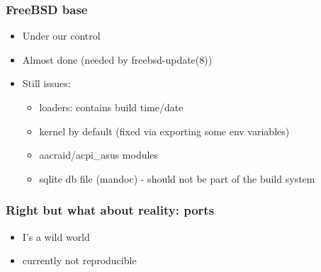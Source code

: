 \begin{frame}
	\frametitle{FreeBSD base}
	\begin{itemize}
		\item Under our control
			\pause
		\item Almost done (needed by freebsd-update(8))
			\pause
		\item Still issues:
			\begin{itemize}
					\pause
				\item loaders: contains build time/date
					\pause
				\item kernel by default (fixed via exporting some env variables)
					\pause
				\item aacraid/acpi\_asus modules
					\pause
				\item sqlite db file (mandoc) - should not be part of the build system
			\end{itemize}
	\end{itemize}
\end{frame}

\begin{frame}
	\frametitle{Right but what about reality: ports}
	\begin{itemize}
			\pause
		\item I's a wild world
			\pause
		\item currently not reproducible
	\end{itemize}
	\pause
\end{frame}

